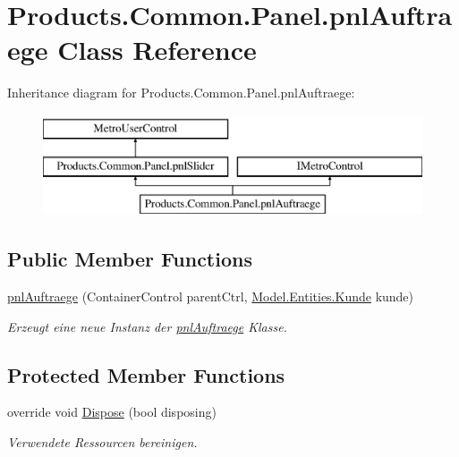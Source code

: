 \hypertarget{class_products_1_1_common_1_1_panel_1_1pnl_auftraege}{}\section{Products.\+Common.\+Panel.\+pnl\+Auftraege Class Reference}
\label{class_products_1_1_common_1_1_panel_1_1pnl_auftraege}
Inheritance diagram for Products.\+Common.\+Panel.\+pnl\+Auftraege\+:\begin{figure}[H]
\begin{center}
\leavevmode
\includegraphics[height=3.000000cm]{class_products_1_1_common_1_1_panel_1_1pnl_auftraege}
\end{center}
\end{figure}
\subsection*{Public Member Functions}
\begin{DoxyCompactItemize}
\item 
\hyperlink{class_products_1_1_common_1_1_panel_1_1pnl_auftraege_ac4c8e4626bd90458787b44c7892c8a5c}{pnl\+Auftraege} (Container\+Control parent\+Ctrl, \hyperlink{class_products_1_1_model_1_1_entities_1_1_kunde}{Model.\+Entities.\+Kunde} kunde)
\begin{DoxyCompactList}\small\item\em Erzeugt eine neue Instanz der \hyperlink{class_products_1_1_common_1_1_panel_1_1pnl_auftraege}{pnl\+Auftraege} Klasse. \end{DoxyCompactList}\end{DoxyCompactItemize}
\subsection*{Protected Member Functions}
\begin{DoxyCompactItemize}
\item 
override void \hyperlink{class_products_1_1_common_1_1_panel_1_1pnl_auftraege_a2f82e451b7a7f8fa313d41be8cac04a3}{Dispose} (bool disposing)
\begin{DoxyCompactList}\small\item\em Verwendete Ressourcen bereinigen. \end{DoxyCompactList}\end{DoxyCompactItemize}

